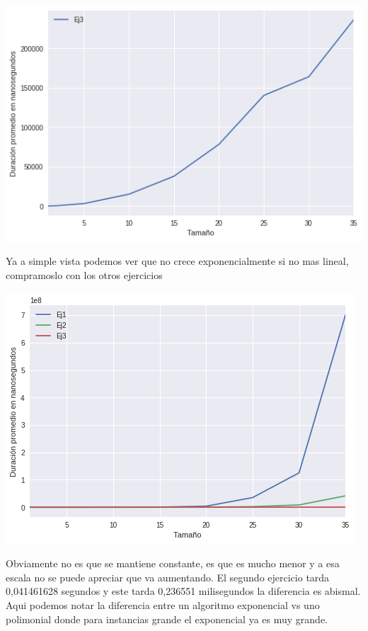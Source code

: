 \begin{center}
\includegraphics[scale=0.5]{ej3Random1-40.png}\\
\end{center}
Ya a simple vista podemos ver que no crece exponencialmente si no mas lineal, compramoslo con los otros ejercicios
\begin{center}
\includegraphics[scale=0.5]{ej123.png}\\
\end{center}
Obviamente no es que se mantiene constante, es que es mucho menor y a esa escala no se puede apreciar que va aumentando. El segundo ejercicio tarda 0,041461628 segundos y este tarda 0,236551 milisegundos la diferencia es abismal. Aqui podemos notar la diferencia entre un algoritmo exponencial vs uno polimonial donde para instancias grande el exponencial ya es muy grande.





